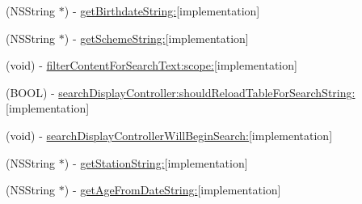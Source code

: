 \begin{DoxyCompactItemize}
(N\+S\+String $\ast$) -\/ \hyperlink{interface_medikamente_view_controller_a498ace480a3e2d37a9ee68034bc34544}{get\+Birthdate\+String\+:}{\ttfamily  \mbox{[}implementation\mbox{]}}
\item 
(N\+S\+String $\ast$) -\/ \hyperlink{interface_medikamente_view_controller_aeb24ed821b5a6a79e7e1aabf03bed6c2}{get\+Scheme\+String\+:}{\ttfamily  \mbox{[}implementation\mbox{]}}
\item 
(void) -\/ \hyperlink{interface_medikamente_view_controller_a7a058f11f9c4b84e4d14953ff8a4fc3e}{filter\+Content\+For\+Search\+Text\+:scope\+:}{\ttfamily  \mbox{[}implementation\mbox{]}}
\item 
(B\+O\+O\+L) -\/ \hyperlink{interface_medikamente_view_controller_a59e8340f03a3551ceff7a33e2bce3649}{search\+Display\+Controller\+:should\+Reload\+Table\+For\+Search\+String\+:}{\ttfamily  \mbox{[}implementation\mbox{]}}
\item 
(void) -\/ \hyperlink{interface_medikamente_view_controller_a84753188124dfa16d816d17b3f24b2fd}{search\+Display\+Controller\+Will\+Begin\+Search\+:}{\ttfamily  \mbox{[}implementation\mbox{]}}
\item 
(N\+S\+String $\ast$) -\/ \hyperlink{interface_medikamente_view_controller_ae39827760247c1a1b90a1d32324a0b09}{get\+Station\+String\+:}{\ttfamily  \mbox{[}implementation\mbox{]}}
\item 
(N\+S\+String $\ast$) -\/ \hyperlink{interface_medikamente_view_controller_af141592e039b5fbbb4c1509721c4d704}{get\+Age\+From\+Date\+String\+:}{\ttfamily  \mbox{[}implementation\mbox{]}}
\end{DoxyCompactItemize}
